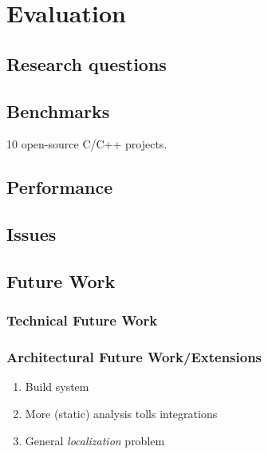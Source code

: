 \documentclass[
  a4paper,
  DIV=11,
  numbers=noendperiod]{scrreprt}
\providecommand{\tightlist}{%
  \setlength{\itemsep}{0pt}\setlength{\parskip}{0pt}}
\theoremstyle{definition}
\theoremstyle{remark}
\begin{document}

\chapter{Evaluation}\label{evaluation}

\section{Research questions}\label{research-questions}

\section{Benchmarks}\label{benchmarks}

10 open-source C/C++ projects.

\section{Performance}\label{performance}

\section{Issues}\label{issues}

\section{Future Work}\label{future-work}

\subsection{Technical Future Work}\label{technical-future-work}

\subsection{Architectural Future
Work/Extensions}\label{architectural-future-workextensions}

\begin{enumerate}
\def\labelenumi{\arabic{enumi}.}
\tightlist
\item
  Build system
\item
  More (static) analysis tolls integrations
\item
  General \emph{localization} problem
\end{enumerate}

\end{document}
